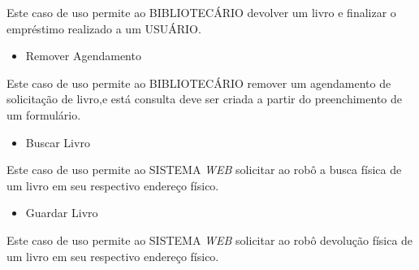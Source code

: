 Este caso de uso permite ao BIBLIOTECÁRIO devolver um livro e finalizar o empréstimo realizado a um USUÁRIO. 

\begin{itemize}
\item{Remover Agendamento}
\end{itemize}

Este caso de uso permite ao BIBLIOTECÁRIO remover um agendamento de solicitação de livro,e está consulta deve ser criada a partir do preenchimento de um formulário.

\begin{itemize}
\item{Buscar Livro}
\end{itemize}

Este caso de uso permite ao SISTEMA \textit{WEB} solicitar ao robô a busca física de um livro em seu respectivo endereço físico.

\begin{itemize}
\item{Guardar Livro}
\end{itemize}

Este caso de uso permite ao SISTEMA \textit{WEB} solicitar ao robô devolução física de um livro em seu respectivo endereço físico.

